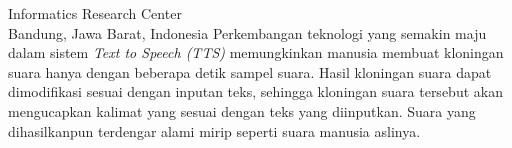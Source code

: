 

{Informatics Research Center\\
Bandung, Jawa Barat, Indonesia}
Perkembangan teknologi yang semakin maju dalam sistem \textit{Text to Speech (TTS)}  memungkinkan manusia membuat kloningan suara hanya dengan beberapa detik sampel suara. Hasil kloningan suara dapat dimodifikasi sesuai dengan inputan teks, sehingga kloningan suara tersebut akan mengucapkan kalimat yang sesuai dengan teks yang diinputkan. Suara yang dihasilkanpun terdengar alami mirip seperti suara manusia aslinya.